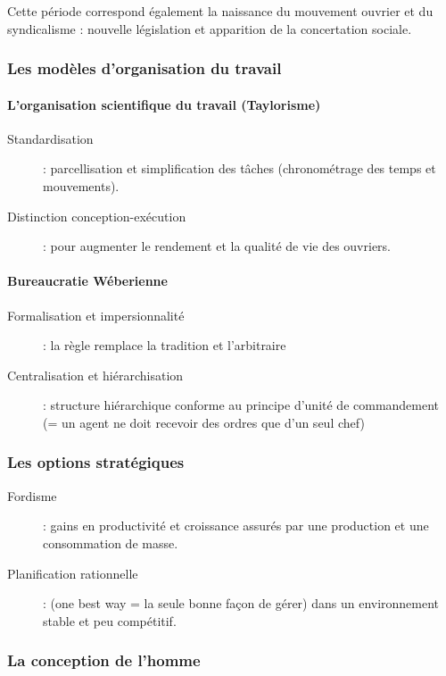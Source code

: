 \documentclass[12pt]{article}
\begin{document}
	  Cette période correspond également la naissance du mouvement ouvrier et du syndicalisme : nouvelle législation et apparition de la concertation sociale.

	  \subsubsection{Les modèles d'organisation du travail}
	  
	  \paragraph{L'organisation scientifique du travail (Taylorisme)}
	  \begin{description}
	   \item[Standardisation] : parcellisation et simplification des tâches (chronométrage des temps et mouvements).
	   \item[Distinction conception-exécution] : pour augmenter le rendement et la qualité de vie des ouvriers.
	  \end{description}
	  
	  \paragraph{Bureaucratie Wéberienne}
	  \begin{description}
	   \item[Formalisation et impersionnalité] : la règle remplace la tradition et l'arbitraire
	   \item[Centralisation et hiérarchisation] : structure hiérarchique conforme au principe d'unité de commandement (= un agent ne doit recevoir des ordres que d'un seul chef)
	  \end{description}
	  
	  \subsubsection{Les options stratégiques}
	  \begin{description}
	   \item[Fordisme] : gains en productivité et croissance assurés par une production et une consommation de masse.
	   \item[Planification rationnelle] : (one best way = la seule bonne façon de gérer) dans un environnement stable et peu compétitif. 
	  \end{description}

	  \subsubsection{La conception de l'homme}
	  
\end{document}
